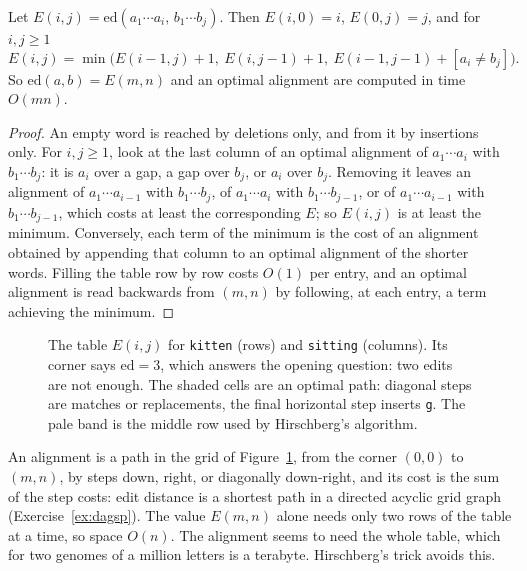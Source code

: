 \begin{theorem}\label{thm:editdistance}
Let $E(i,j)=\mathrm{ed}(a_1\cdots a_i,\,b_1\cdots b_j)$. Then $E(i,0)=i$, $E(0,j)=j$, and for $i,j\ge1$
\[
E(i,j)=\min\big(E(i-1,j)+1,\ E(i,j-1)+1,\ E(i-1,j-1)+[a_i\ne b_j]\big).
\]
So $\mathrm{ed}(a,b)=E(m,n)$ and an optimal alignment are computed in time $O(mn)$.
\end{theorem}
\begin{proof}
An empty word is reached by deletions only, and from it by insertions only. For $i,j\ge1$, look at the last column of an optimal alignment of $a_1\cdots a_i$ with $b_1\cdots b_j$: it is $a_i$ over a gap,
a gap over $b_j$, or $a_i$ over $b_j$. Removing it leaves an alignment of $a_1\cdots a_{i-1}$ with $b_1\cdots b_j$, of $a_1\cdots a_i$ with $b_1\cdots b_{j-1}$, or of $a_1\cdots a_{i-1}$ with $b_1\cdots b_{j-1}$, which costs at least the
corresponding $E$; so $E(i,j)$ is at least the minimum. Conversely, each term of the minimum is the cost of an alignment obtained by appending that column to an optimal alignment of the shorter words.
Filling the table row by row costs $O(1)$ per entry, and an optimal alignment is read backwards from $(m,n)$ by following, at each entry, a term achieving the minimum.
\end{proof}

\begin{figure}[ht]
\centering
{}
\caption{The table $E(i,j)$ for \texttt{kitten} (rows) and \texttt{sitting} (columns). Its corner says $\mathrm{ed}=3$, which answers the opening question: two edits are not enough. The shaded
cells are an optimal path: diagonal steps are matches or replacements, the final horizontal step inserts \texttt{g}. The pale band is the middle row used by Hirschberg's algorithm.}
\label{fig:editgrid}
\end{figure}

An alignment is a path in the grid of Figure~\ref{fig:editgrid}, from the corner $(0,0)$ to $(m,n)$, by steps down, right, or diagonally down-right, and its cost is the sum of the step costs:
edit distance is a shortest path in a directed acyclic grid graph (Exercise~\ref{ex:dagsp}). The value $E(m,n)$ alone needs only two rows of the table at a time, so space $O(n)$. The alignment seems to need the whole
table, which for two genomes of a million letters is a terabyte. Hirschberg's trick avoids this.

